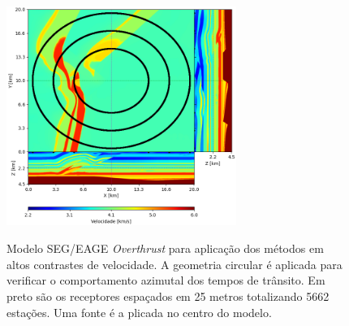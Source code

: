 \begin{figure}[H]
	\centering
	\includegraphics[width = 7.5cm, height = 7.9cm]{Imgs/Metodologia/overthrust.png}
	\caption{Modelo SEG/EAGE \textit{Overthrust} para aplicação dos métodos em altos contrastes de velocidade. A geometria circular é aplicada para verificar o comportamento azimutal dos tempos de trânsito. Em preto são os receptores espaçados em 25 metros totalizando 5662 estações. Uma fonte é a plicada no centro do modelo.}
	\label{fig:overthrust}
\end{figure}







